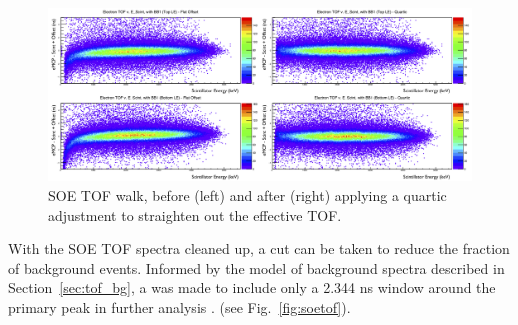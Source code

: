 \begin{figure}[h!!!!tb]
	\centering
	\includegraphics[width=.999\linewidth]
	{Figures/WalkAdjust.png}
	\caption{SOE TOF walk, before (left) and after (right) applying a quartic adjustment to straighten out the effective TOF.}	
	\label{fig:WalkAdjust}
\end{figure}

With the SOE TOF spectra cleaned up, a cut can be taken to reduce the fraction of background events.  Informed by the model of background spectra described in Section~\ref{sec:tof_bg}, a was made to include only a 2.344 ns window around the primary peak in further analysis . (see Fig.~\ref{fig:soetof}).




